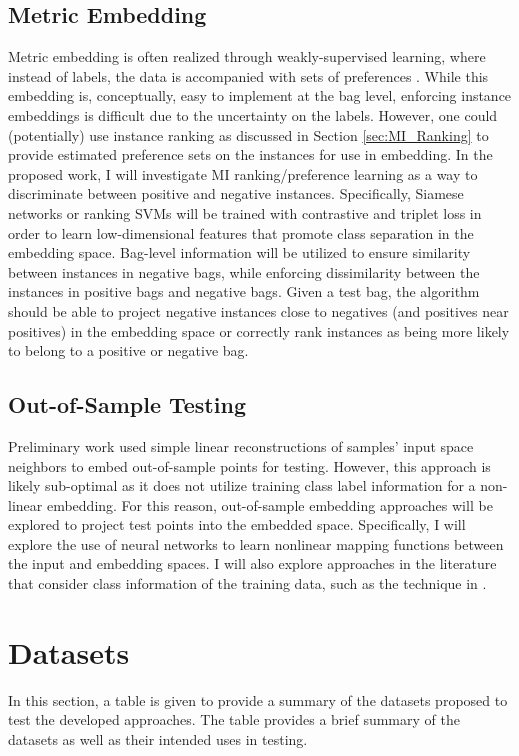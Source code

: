 \subsection{Metric Embedding}
Metric embedding is often realized through weakly-supervised learning, where instead of labels, the data is accompanied with sets of preferences \citep{Hermans2017DefenseTripletLoss,Koch2015SiameseNetworks,Schroff2015FaceNet}. While this embedding is, conceptually, easy to implement at the bag level, enforcing instance embeddings is difficult due to the uncertainty on the labels.  However, one could (potentially) use instance ranking as discussed in Section \ref{sec:MI_Ranking} to provide estimated preference sets on the instances for use in embedding.  In the proposed work, I will investigate MI ranking/preference learning as a way to discriminate between positive and negative instances.  Specifically, Siamese networks or ranking SVMs will be trained with contrastive and triplet loss in order to learn low-dimensional features that promote class separation in the embedding space.  Bag-level information will be utilized to ensure similarity between instances in negative bags, while enforcing dissimilarity between the instances in positive bags and negative bags.  Given a test bag, the algorithm should be able to project negative instances close to negatives (and positives near positives) in the embedding space or correctly rank instances as being more likely to belong to a positive  or negative bag.  

\subsection{Out-of-Sample Testing}
Preliminary work used simple linear reconstructions of  samples' input space neighbors to embed out-of-sample points for testing.  However, this approach is likely sub-optimal as it does not utilize training class label information for a non-linear embedding.  For this reason, out-of-sample embedding approaches will be explored to project test points into the embedded space.  Specifically, I will explore the use of neural networks to learn nonlinear mapping functions between the input and embedding spaces.  I will also explore  approaches in the literature that consider class information of the training data, such as the technique in \citep{Vural2016OutOfSampleSupManifoldLearning}. 

\section{Datasets}
In this section, a table is given to provide a summary of the datasets proposed to test the developed approaches.  The table provides a brief summary of the datasets as well as their intended uses in testing.

